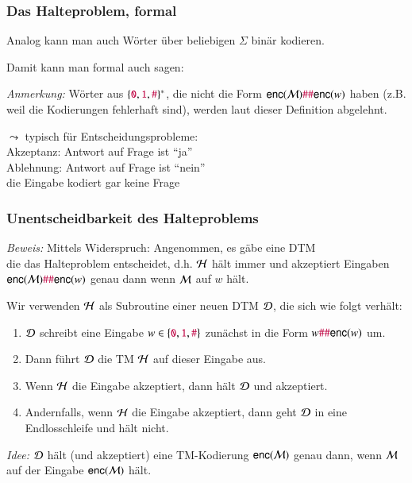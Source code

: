 \documentclass[aspectratio=1610,onlymath]{beamer}
\begin{document}
\begin{frame}\frametitle{Das Halteproblem, formal}

Analog kann man auch Wörter über beliebigen $\Sigma$ binär kodieren.
\medskip

Damit kann man formal auch sagen:

\pause

\emph{Anmerkung:} Wörter aus $\{\mathtt{\textcolor{purple}{0}},\mathtt{\textcolor{purple}{1}},\mathtt{\textcolor{purple}{\#}}\}^*$, die nicht die Form
$\textsf{enc}(\mathcal{M})\mathtt{\textcolor{purple}{\#}}\mathtt{\textcolor{purple}{\#}}\textsf{enc}(w)$ haben (z.B. weil die Kodierungen fehlerhaft sind), werden
laut dieser Definition abgelehnt.\medskip

$\leadsto$ typisch für Entscheidungsprobleme:\\
\hspace{1cm}\alert{Akzeptanz:} Antwort auf Frage ist "`ja"'\\
\hspace{1cm}\alert{Ablehnung:} Antwort auf Frage ist "`nein"' \\
\hspace{2.74cm}die Eingabe kodiert gar keine Frage

\end{frame}

\begin{frame}[t]\frametitle{Unentscheidbarkeit des Halteproblems}


\emph{Beweis:} Mittels Widerspruch: Angenommen, es gäbe eine DTM \\
die das
Halteproblem entscheidet, d.h. $\mathcal{H}$ hält immer und akzeptiert Eingaben $\textsf{enc}(\mathcal{M})\mathtt{\textcolor{purple}{\#}}\mathtt{\textcolor{purple}{\#}}\textsf{enc}(w)$ genau dann wenn $\mathcal{M}$ auf $w$ hält.
\medskip\pause

Wir verwenden $\mathcal{H}$ als Subroutine einer neuen DTM $\mathcal{D}$, die sich wie folgt verhält:\pause
\begin{enumerate}[(1)]
\item $\mathcal{D}$ schreibt eine Eingabe $w\in\{\mathtt{\textcolor{purple}{0}},\mathtt{\textcolor{purple}{1}},\mathtt{\textcolor{purple}{\#}}\}$ zunächst in die Form
	$w\mathtt{\textcolor{purple}{\#}}\mathtt{\textcolor{purple}{\#}}\textsf{enc}(w)$ um.\pause
\item Dann führt $\mathcal{D}$ die TM $\mathcal{H}$ auf dieser Eingabe aus.\pause
\item Wenn $\mathcal{H}$ die Eingabe  akzeptiert, dann hält $\mathcal{D}$ und akzeptiert.\pause
\item Andernfalls, wenn $\mathcal{H}$ die Eingabe akzeptiert, dann geht $\mathcal{D}$ in eine Endlosschleife und hält nicht.\pause
\end{enumerate}
\emph{Idee:} $\mathcal{D}$ hält (und akzeptiert) eine TM-Kodierung $\textsf{enc}(\mathcal{M})$ genau dann, wenn
$\mathcal{M}$ auf der Eingabe $\textsf{enc}(\mathcal{M})$  hält.

\end{frame}
\end{document}
